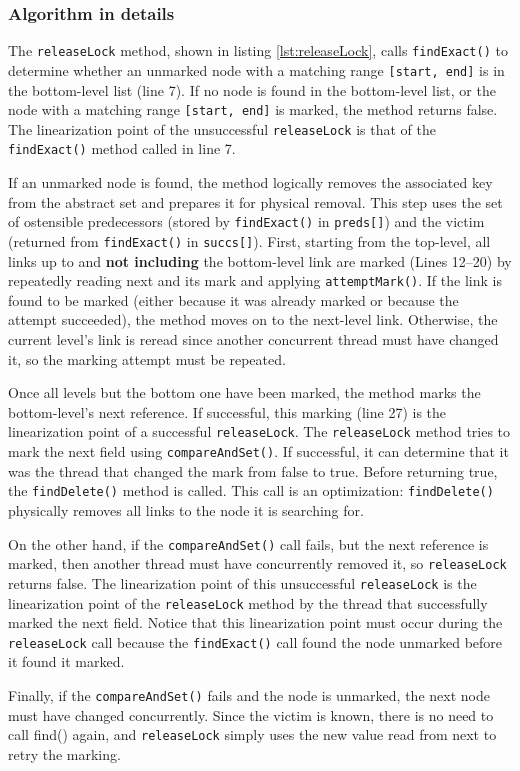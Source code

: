 \subsubsection*{Algorithm in details}

The \texttt{releaseLock} method, shown in listing \ref{lst:releaseLock}, calls \texttt{findExact()} to determine whether an unmarked node with a matching range \texttt{[start, end]} is in the bottom-level list (line 7). 
If no node is found in the bottom-level list, or the node with a matching range \texttt{[start, end]} is marked, the method returns false. 
The linearization point of the unsuccessful \texttt{releaseLock} is that of the \texttt{findExact()} method called in line 7. 

If an unmarked node is found, the method logically removes the associated key from the abstract set and prepares it for physical removal. 
This step uses the set of ostensible predecessors (stored by \texttt{findExact()} in \texttt{preds[]}) and the victim (returned from \texttt{findExact()} in \texttt{succs[]}). 
First, starting from the top-level, all links up to and \textbf{not including} the bottom-level link are marked (Lines 12--20) by repeatedly reading next and its mark and applying \texttt{attemptMark()}. 
If the link is found to be marked (either because it was already marked or because the attempt succeeded), the method moves on to the next-level link. 
Otherwise, the current level's link is reread since another concurrent thread must have changed it, so the marking attempt must be repeated. 

Once all levels but the bottom one have been marked, the method marks the bottom-level's next reference. 
If successful, this marking (line 27) is the linearization point of a successful \texttt{releaseLock}. The \texttt{releaseLock} method tries to mark the next field using \texttt{compareAndSet()}. 
If successful, it can determine that it was the thread that changed the mark from false to true. Before returning true, the \texttt{findDelete()} method is called. This call is an optimization: \texttt{findDelete()} physically removes all links to the node it is searching for.

On the other hand, if the  \texttt{compareAndSet()} call fails, but the next reference is marked, then another thread must have concurrently removed it, so \texttt{releaseLock} returns false. 
The linearization point of this unsuccessful \texttt{releaseLock} is the linearization point of the \texttt{releaseLock} method by the thread that successfully marked the next field. 
Notice that this linearization point must occur during the \texttt{releaseLock} call because the \texttt{findExact()} call found the node unmarked before it found it marked.

Finally, if the \texttt{compareAndSet()} fails and the node is unmarked, the next node must have changed concurrently. 
Since the victim is known, there is no need to call find() again, and \texttt{releaseLock} simply uses the new value read from next to retry the marking.